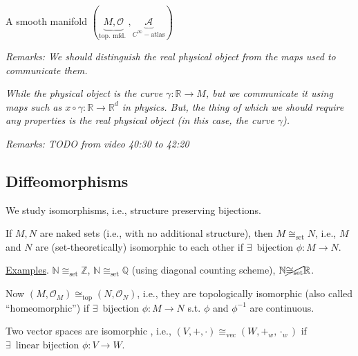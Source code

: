 \begin{definition}
  A smooth manifold $(\underbrace{ M,\mathcal{O} }_{\text{top. mfd. } }, \underbrace{ \mathcal{A}}_{C^{\infty}-\text{atlas}} )$ 
\end{definition}

\textit{Remarks: We should distinguish the real physical object from the maps used to communicate them.}


\textit{While the physical object is the curve $\gamma : \mathbb{R} \to M$, but we communicate it using maps such as $x \circ \gamma : \mathbb{R} \to \mathbb{R}^d$ in physics. But, the thing of which we should require any properties is the real physical object (in this case, the curve $\gamma$).}

\textit{Remarks: TODO from video 40:30 to 42:20}

\subsection{Diffeomorphisms}

We study isomorphisms, i.e., structure preserving bijections.

If $M,N$ are naked sets (i.e., with no additional structure), then $M \cong_{\text{set}} N$, i.e., $M$ and $N$ are (set-theoretically) isomorphic to each other if $\exists \, $ bijection $\phi : M \to N$.

\underline{Examples}.  $\mathbb{N} \cong_{\text{set}} \mathbb{Z}$, $\mathbb{N} \cong_{\text{set}} \mathbb{Q}$  (using diagonal counting scheme), $\mathbb{N} \cancel{\cong_{\text{set}}} \mathbb{R}$.

Now $(M, \mathcal{O}_M) \cong_{\text{top}} (N,\mathcal{O}_N)$, i.e., they are topologically isomorphic (also called ``homeomorphic'') if $\exists \, $ bijection $\phi : M \to N$  s.t. $\phi$ and $\phi^{-1}$ are continuous.  

Two vector spaces are isomorphic , i.e., $(V,+,\cdot) \cong_{\text{vec}} ( W,+_w,\cdot_w)$ if $\exists \, \text{ linear bijection } \phi : V \to W$.

